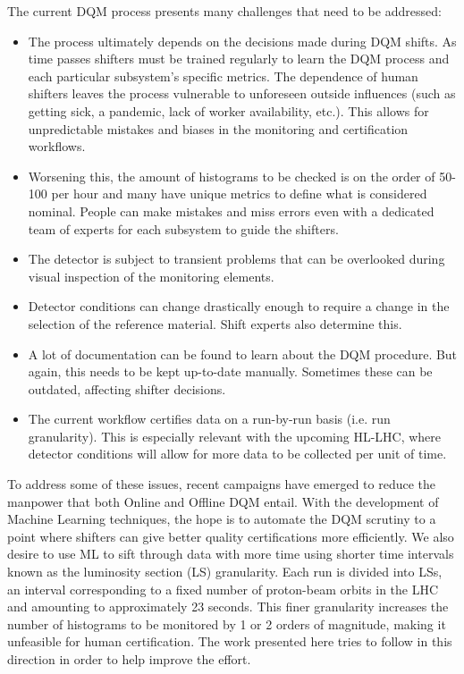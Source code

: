 The current DQM process presents many challenges that need to be addressed:
\begin{itemize}
	\item The process ultimately depends on the decisions made during DQM shifts. As time passes shifters must be trained regularly to learn the DQM process and each particular subsystem's specific metrics. The dependence of human shifters leaves the process vulnerable to unforeseen outside influences (such as getting sick, a pandemic, lack of worker availability, etc.). This allows for unpredictable mistakes and biases in the monitoring and certification workflows.

	\item  Worsening this, the amount of histograms to be checked is on the order of 50-100 per hour and many have unique metrics to define what is considered nominal. People can make mistakes and miss errors even with a dedicated team of experts for each subsystem to guide the shifters.

	\item The detector is subject to transient problems that can be overlooked during visual inspection of the monitoring elements. \cite{ML4DQM}

	\item Detector conditions can change drastically enough to require a change in the selection of the reference material. Shift experts also determine this.

	\item A lot of documentation can be found to learn about the DQM procedure. But again, this needs to be kept up-to-date manually. Sometimes these can be outdated, affecting shifter decisions.

	\item The current workflow certifies data on a run-by-run basis (i.e. run granularity). This is especially relevant with the upcoming HL-LHC, where detector conditions will allow for more data to be collected per unit of time.
\end{itemize}

To address some of these issues, recent campaigns have emerged to reduce the manpower that both Online and Offline DQM entail. With the development of Machine Learning techniques, the hope is to automate the DQM scrutiny to a point where shifters can give better quality certifications more efficiently. We also desire to use ML to sift through data with more time using shorter time intervals known as the luminosity section (LS) granularity.
Each run is divided into LSs, an interval corresponding to a fixed number of proton-beam orbits in the LHC and amounting to approximately 23 seconds.
This finer granularity increases the number of histograms to be monitored by 1 or 2 orders of magnitude, making it unfeasible for human certification\cite{ML4DQM}. The work presented here tries to follow in this direction in order to help improve the effort.

